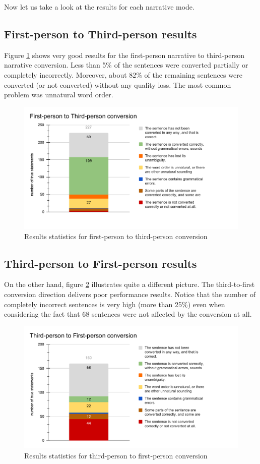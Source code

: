 Now let us take a look at the results for each narrative mode.

\subsection{First-person to Third-person results}

Figure \ref{fig:eval-first-to-third} shows very good results for the first-person narrative to third-person narrative conversion. Less than 5\% of the sentences were converted partially or completely incorrectly. Moreover, about 82\% of the remaining sentences were converted (or not converted) without any quality loss. The most common problem was unnatural word order.

\begin{figure}[!ht]
\includegraphics[width=\textwidth]{data/Eval-First-To-Third.pdf}
\caption{Results statistics for first-person to third-person conversion}
\label{fig:eval-first-to-third}
\end{figure}



\subsection{Third-person to First-person results}
On the other hand, figure \ref{fig:eval-third-to-first} illustrates quite a different picture. The third-to-first conversion direction delivers poor performance results. Notice that the number of completely incorrect sentences is very high (more than 25\%) even when considering the fact that 68 sentences were not affected by the conversion at all.

\begin{figure}[!ht]
\includegraphics[width=\textwidth]{data/Eval-Third-To-First.pdf}
\caption{Results statistics for third-person to first-person conversion}
\label{fig:eval-third-to-first}
\end{figure}

